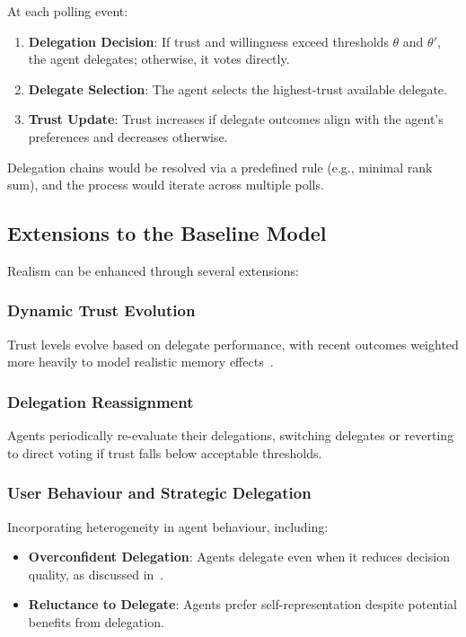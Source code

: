 At each polling event:

\begin{enumerate}
    \item \textbf{Delegation Decision}: If trust and willingness exceed thresholds $\theta$ and $\theta'$, the agent delegates; otherwise, it votes directly.
    \item \textbf{Delegate Selection}: The agent selects the highest-trust available delegate.
    \item \textbf{Trust Update}: Trust increases if delegate outcomes align with the agent's preferences and decreases otherwise.
\end{enumerate}

Delegation chains would be resolved via a predefined rule (e.g., minimal rank sum), and the process would iterate across multiple polls.

\subsection{Extensions to the Baseline Model}

Realism can be enhanced through several extensions:

\subsubsection{Dynamic Trust Evolution}

Trust levels evolve based on delegate performance, with recent outcomes weighted more heavily to model realistic memory effects~\citep{casella_2022}.

\subsubsection{Delegation Reassignment}

Agents periodically re-evaluate their delegations, switching delegates or reverting to direct voting if trust falls below acceptable thresholds.

\subsubsection{User Behaviour and Strategic Delegation}

Incorporating heterogeneity in agent behaviour, including:

\begin{itemize}
    \item \textbf{Overconfident Delegation}: Agents delegate even when it reduces decision quality, as discussed in~\citet{casella_2022}.
    \item \textbf{Reluctance to Delegate}: Agents prefer self-representation despite potential benefits from delegation.
\end{itemize}


